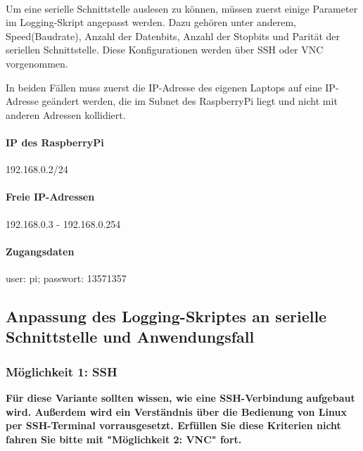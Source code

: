 \documentclass{article}
\begin{document}
\paragraph{}
Um eine serielle Schnittstelle auslesen zu können, müssen zuerst einige Parameter im Logging-Skript angepasst werden. Dazu gehören unter anderem, Speed(Baudrate), Anzahl der Datenbits, Anzahl der Stopbits und Parität der seriellen Schnittstelle. Diese Konfigurationen werden über SSH oder VNC vorgenommen. 

In beiden Fällen muss zuerst die IP-Adresse des eigenen Laptops auf eine IP-Adresse geändert werden, die im Subnet des RaspberryPi liegt und nicht mit anderen Adressen kollidiert.
\paragraph{IP des RaspberryPi}192.168.0.2/24
\paragraph{Freie IP-Adressen}192.168.0.3 - 192.168.0.254

\paragraph{Zugangsdaten}user: pi; passwort: 13571357

\pagebreak
\subsection{Anpassung des Logging-Skriptes an serielle Schnittstelle und Anwendungsfall}
\subsubsection{Möglichkeit 1: SSH}

\textbf{Für diese Variante sollten wissen, wie eine SSH-Verbindung aufgebaut wird. Außerdem wird ein Verständnis über die Bedienung von Linux per SSH-Terminal vorrausgesetzt. Erfüllen Sie diese Kriterien nicht fahren Sie bitte mit "Möglichkeit 2: VNC" fort.}
\end{document}
